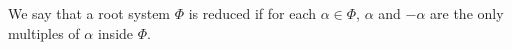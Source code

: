 We say that a root system $\Phi$ is reduced if for each $\alpha \in \Phi$,
$\alpha$ and $-\alpha$ are the only multiples of $\alpha$ inside $\Phi$.
